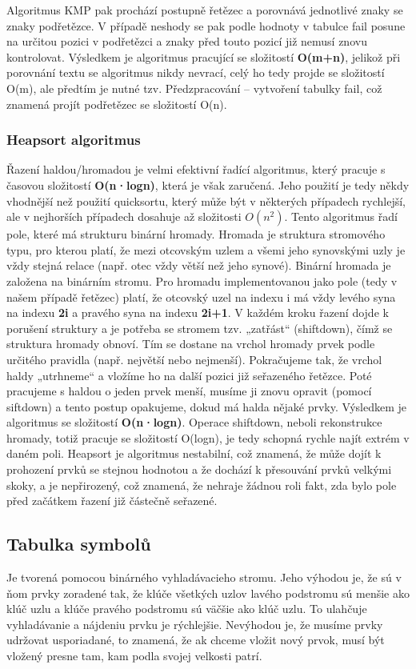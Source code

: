 \documentclass[12pt, a4paper]{article}
\begin{document}
				Algoritmus KMP pak prochází postupně řetězec a porovnává jednotlivé znaky se znaky podřetězce. V případě neshody se pak podle hodnoty v tabulce fail posune na určitou pozici v podřetězci a znaky před touto pozicí již nemusí znovu kontrolovat.
				Výsledkem je algoritmus pracující se složitostí \textbf{O(m+n)}, jelikož při porovnání textu se algoritmus nikdy nevrací, celý ho tedy projde se složitostí O(m), ale předtím je nutné tzv. Předzpracování – vytvoření tabulky fail, což znamená projít podřetězec se složitostí O(n).
				
			\subsubsection{Heapsort algoritmus}
				Řazení haldou/hromadou je velmi efektivní řadící algoritmus, který pracuje s časovou složitostí \textbf{O(n·logn)}, která je však zaručená. Jeho použití je tedy někdy vhodnější než použití quicksortu, který může být v některých případech rychlejší, ale v nejhorších případech dosahuje až složitosti \(O(n^2)\).
				Tento algoritmus řadí pole, které má strukturu binární hromady. Hromada je struktura stromového typu, pro kterou platí, že mezi otcovským uzlem a všemi jeho synovskými uzly je vždy stejná relace (např. otec vždy větší než jeho synové). Binární hromada je založena na binárním stromu.
				Pro hromadu implementovanou jako pole (tedy v našem případě řetězec) platí, že otcovský uzel na indexu i má vždy levého syna na indexu \textbf{2i} a pravého syna na indexu \textbf{2i+1}.
				V každém kroku řazení dojde k porušení struktury a je potřeba se stromem tzv. „zatřást“ (shiftdown), čímž se struktura hromady obnoví.
				Tím se dostane na vrchol hromady prvek podle určitého pravidla (např. největší nebo nejmenší). Pokračujeme tak, že vrchol haldy „utrhneme“ a vložíme ho na další pozici již seřazeného řetězce. Poté pracujeme s haldou o jeden prvek menší, musíme ji znovu opravit (pomocí siftdown) a tento postup opakujeme, dokud má halda nějaké prvky.
				Výsledkem je algoritmus se složitostí \textbf{O(n·logn)}. Operace shiftdown, neboli rekonstrukce hromady, totiž pracuje se složitostí O(logn), je tedy schopná rychle najít extrém v daném poli. Heapsort je algoritmus nestabilní, což znamená, že může dojít k prohození prvků se stejnou hodnotou a že dochází k přesouvání prvků velkými skoky, a je nepřirozený, což znamená, že nehraje žádnou roli fakt, zda bylo pole před začátkem řazení již částečně seřazené.
				
			\subsection{Tabulka symbolů}	
				Je tvorená pomocou binárného vyhladávacieho stromu. Jeho výhodou je, že sú v ňom prvky zoradené tak, že klúče všetkých uzlov lavého podstromu 
				sú menšie ako klúč uzlu a klúče pravého podstromu sú väčšie ako klúč uzlu. To ulahčuje vyhladávanie a nájdeniu prvku je rýchlejšie. 
				Nevýhodou je, že musíme prvky udržovat usporiadané, to znamená, že ak chceme vložit nový prvok, musí být vložený presne tam, kam podla 
				svojej velkosti patrí.
				
\end{document}
